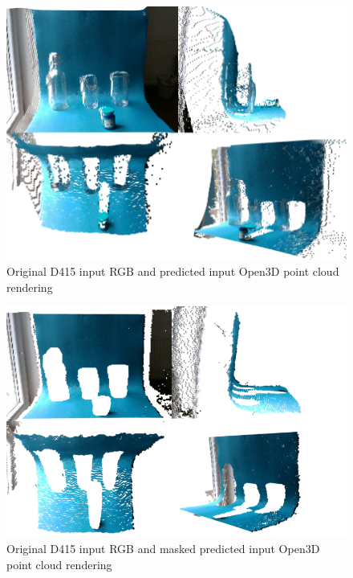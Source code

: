 \begin{figure}[h!]
\centering
\includegraphics[width=\textwidth]{Figures/20210627101252_d415_output.png}
\caption{Original D415 input RGB and predicted input Open3D point cloud rendering}
\label{fig:20210627101252_d415_output_depth}
\end{figure}

\begin{figure}[h!]
\centering
\includegraphics[width=\textwidth]{Figures/20210627101252_d415_dp_output.png}
\caption{Original D415 input RGB and masked predicted input Open3D point cloud rendering}
\label{fig:20210627101252_d415_dp_output}
\end{figure}

